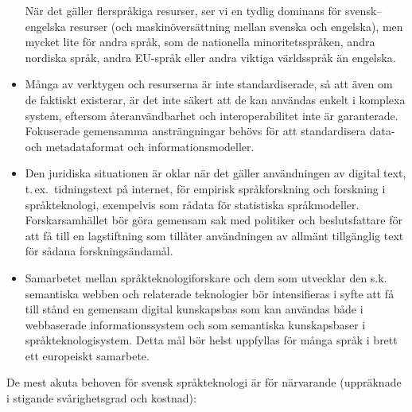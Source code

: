 \begin{multicols}{2}
\begin{itemize}
När det gäller flerspråkiga resurser, ser vi en tydlig dominans för
svensk--engelska resurser (och maskin\-över\-sätt\-ning mellan svenska och
engelska), men mycket lite för andra språk, som de nationella
minoritetsspråken, andra nordiska språk, andra EU-språk eller andra
viktiga världsspråk än engelska.
\item Många av verktygen och resurserna är inte standardiserade, så
  att även om de faktiskt exi\-ste\-rar, är det inte säkert att de kan
  användas enkelt i komplexa system, eftersom åter\-an\-vänd\-bar\-het
  och inter\-operabilitet inte är garanterade. Fokuserade gemensamma
  ansträngningar behövs för att standardisera \mbox{data-} och
  metadataformat och informationsmodeller.
\item Den juridiska situationen är oklar när det gäller användningen
  av digital text, t.\,ex.~tidningstext på internet, för empirisk
  språkforskning och forskning i språkteknologi, exempelvis som rådata
  för statistiska språkmodeller. Forskarsamhället bör göra gemensam
  sak med politiker och beslutsfattare för att få till en lagstiftning
  som tillåter användningen av allmänt tillgänglig text för sådana
  forskningsändamål.
\item Samarbetet mellan språkteknologiforskare och dem som utvecklar
  den s.k. semantiska webben och relaterade teknologier bör
  intensifieras i syfte att få till stånd en gemensam digital
  kunskapsbas som kan användas både i webbaserade informationssystem
  och som semantiska kunskapsbaser i språk\-tekno\-logi\-sys\-tem. Detta mål
  bör helst uppfyllas för många språk i brett ett europeiskt
  samarbete.

\end{itemize}

De mest akuta behoven för svensk språkteknologi är för närvarande
(uppräknade i stigande svårighetsgrad och kostnad):


\end{multicols}
